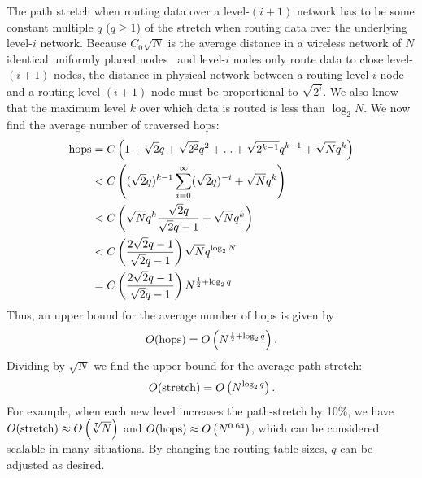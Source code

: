 \documentclass[conference]{IEEEtran}
\theoremstyle{definition}
\begin{document}
The path stretch when routing data over a level-$(i+1)$ network has to be some constant multiple $q$ ($q \ge 1$) of the stretch when routing data over the underlying level-$i$ network. Because $C_0\sqrt{N}$ is the average distance in a wireless network of $N$ identical uniformly placed nodes~\cite{Kleinrock} and level-$i$ nodes only route data to close level-$(i+1)$ nodes, the distance in physical network between a routing level-$i$ node and a routing level-$(i+1)$ node must be proportional to $\sqrt{2^i}$. We also know that the maximum level $k$ over which data is routed is less than $\log_2N$. We now find the average number of traversed hops:
\begin{equation*}
\begin{split}
    {\rm hops} & = C \left (1 + \sqrt{2} q + \sqrt{2^2} q^2  + ... + \sqrt{2^{k-1}} q^{k-1} + \sqrt{N} q^k \right ) \\
              & < C \left( (\sqrt{2} q)^{k-1} \sum_{i = 0}^{\infty} (\sqrt{2}q)^{-i} + \sqrt{N} q^k \right ) \\
               & < C \left ( \sqrt{N} q^k \frac{\sqrt{2} q}{\sqrt{2}q - 1} + \sqrt{N} q^k \right )  \\
               & < C \left ( \frac{2\sqrt{2}q - 1}{\sqrt{2}q - 1} \right ) \sqrt{N} q^{\log_2 N}  \\
               & = C \left ( \frac{2\sqrt{2}q - 1}{\sqrt{2}q - 1} \right ) N^{\frac{1}{2} + \log_2 q}
\end{split}
\end{equation*}
Thus, an upper bound for the average number of hops is given by
\begin{equation*}
    O({\rm hops}) = O \left ( N^{\frac{1}{2} + \log_2 q} \right ) .
\end{equation*}
Dividing by $\sqrt{N}$ we find the upper bound for the average path stretch:
\begin{equation*}
    O({\rm stretch}) = O \left ( N^{\log_2 q} \right ) .
\end{equation*}
For example, when each new level increases the path-stretch by 10\%, we have $O({\rm stretch}) \approx O \left ( \sqrt[7]{N} \right )$ and $O({\rm hops}) \approx O \left ( N^{0.64} \right )$, which can be considered scalable in many situations. By changing the routing table sizes, $q$ can be adjusted as desired.
\end{document}
